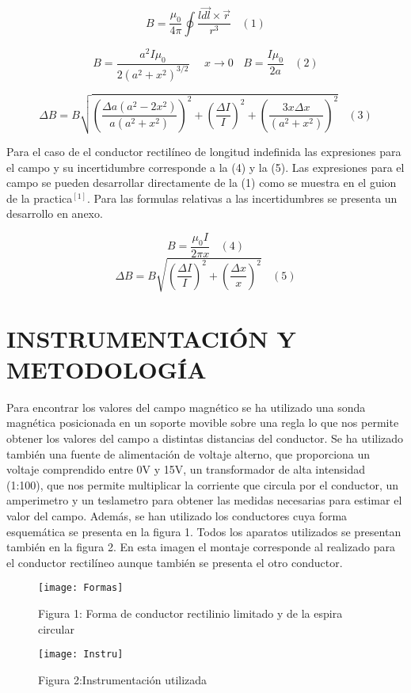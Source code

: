 \documentclass[article, 11pt]{report}
\begin{document}
	$$ B = \dfrac{\mu_0}{4\pi}\oint \dfrac{l\vec{dl} \times \vec{r}}{r^3} ~~~~ (1)$$
	
	$$ B = \dfrac{a^2 I \mu_0 }{2(a^2+x^2)^{3/2}} ~~~~~~ x\rightarrow0 ~~~~ B= \dfrac{I\mu_0}{2a} ~~~~ (2)$$
	
	$$ \Delta B = B \sqrt{(\dfrac{\Delta a (a^2 -2x^2)}{a(a^2+x^2)})^2 + (\dfrac{\Delta I}{I})^2 +  (\dfrac{3x\Delta x }{(a^2 + x^2)})^2}  ~~~~ (3) $$
	
	\vspace{0.25cm}
	 Para el caso de el conductor rectilíneo de longitud indefinida las expresiones para el campo y su incertidumbre corresponde a la (4) y la (5). Las expresiones para el campo se pueden desarrollar directamente de la (1) como se muestra en el guion de la practica$^[1]$. Para las formulas relativas a las incertidumbres se presenta un desarrollo en anexo. 
	
	$$ B= \dfrac{\mu_0 I }{2\pi x} ~~~~(4)$$
	$$\Delta B = B\sqrt{(\dfrac{\Delta I}{I})^2 + (\dfrac{\Delta x}{x})^2} ~~~~ (5)$$
	

\newpage
	
	\section{INSTRUMENTACIÓN Y METODOLOGÍA}
	
	Para encontrar los valores del campo magnético se ha utilizado una sonda magnética posicionada en un soporte movible sobre una regla lo que nos permite obtener los valores del campo a distintas distancias del conductor. Se ha utilizado también una fuente de alimentación de voltaje alterno, que proporciona un voltaje comprendido entre 0V y 15V, un transformador de alta intensidad (1:100), que nos permite multiplicar la corriente que circula por el conductor, un amperimetro y un teslametro para obtener las medidas necesarias para estimar el valor del campo. Además, se han utilizado los conductores cuya forma esquemática se presenta en la figura 1. Todos los aparatos utilizados se presentan también en la figura 2. En esta imagen el montaje corresponde al realizado para el conductor rectilíneo aunque también se presenta el otro conductor.  
	
	\begin{figure}[H]
		\centering
		\begin{minipage}{.45\textwidth}
			\centering
			\texttt{[image: Formas]}
			\caption*{Figura 1: Forma de conductor rectilinio limitado y de la espira circular 
				}
		\end{minipage}%
		\begin{minipage}{.45\textwidth}
			\centering
			\texttt{[image: Instru]}
			\caption*{Figura 2:Instrumentación utilizada}
			
		\end{minipage}
	\end{figure}
\end{document}
